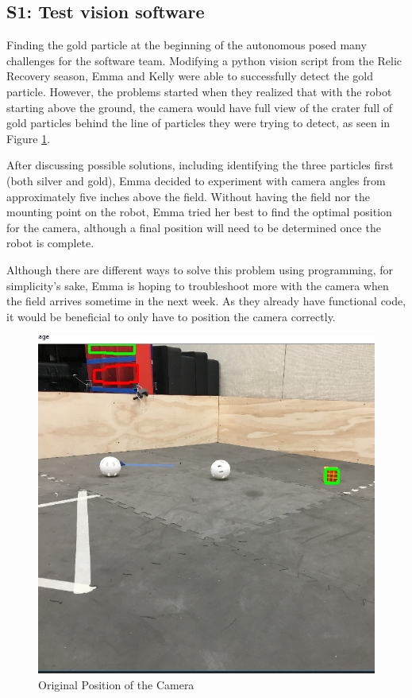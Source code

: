 \documentclass{article}
\begin{document}
\subsection{S1: Test vision software}

Finding the gold particle at the beginning of the autonomous posed many challenges for the software team. Modifying a python vision script from the Relic Recovery season, Emma and Kelly were able to successfully detect the gold particle. However, the problems started when they realized that with the robot starting above the ground, the camera would have full view of the crater full of gold particles behind the line of particles they were trying to detect, as seen in
Figure \ref{fig:camera}.

After discussing possible solutions, including identifying the three particles first (both silver and gold), Emma decided to experiment with camera angles from approximately five inches above the field. Without having the field nor the mounting point on the robot, Emma tried her best to find the optimal position for the camera, although a final position will need to be determined once the robot is complete. 

Although there are different ways to solve this problem using programming, for simplicity's sake, Emma is hoping to troubleshoot more with the camera when the field arrives sometime in the next week. As they already have functional code, it would be beneficial to only have to position the camera correctly. 

\begin{figure}
    \centering
    \includegraphics[width=.6\textwidth]{02_09-10/images/originalcameraposition.png}
    \caption{Original Position of the Camera}
    \label{fig:camera}
\end{figure}
\end{document}
